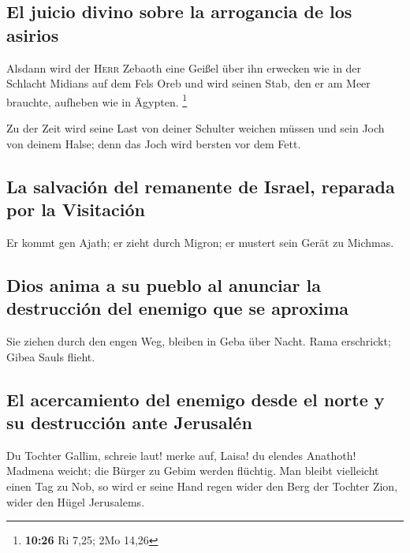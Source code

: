\hypertarget{el-juicio-divino-sobre-la-arrogancia-de-los-asirios}{%
\subsection{El juicio divino sobre la arrogancia de los
asirios}\label{el-juicio-divino-sobre-la-arrogancia-de-los-asirios}}

 Alsdann wird der \textsc{Herr} Zebaoth eine Geißel über
ihn erwecken wie in der Schlacht Midians auf dem Fels Oreb und wird
seinen Stab, den er am Meer brauchte, aufheben wie in Ägypten.
\footnote{\textbf{10:26} Ri 7,25; 2Mo 14,26}

 Zu der Zeit wird seine Last von deiner Schulter weichen
müssen und sein Joch von deinem Halse; denn das Joch wird bersten vor
dem Fett.

\hypertarget{la-salvaciuxf3n-del-remanente-de-israel-reparada-por-la-visitaciuxf3n}{%
\subsection{La salvación del remanente de Israel, reparada por la
Visitación}\label{la-salvaciuxf3n-del-remanente-de-israel-reparada-por-la-visitaciuxf3n}}

 Er kommt gen Ajath; er zieht durch Migron; er mustert
sein Gerät zu Michmas.

\hypertarget{dios-anima-a-su-pueblo-al-anunciar-la-destrucciuxf3n-del-enemigo-que-se-aproxima}{%
\subsection{Dios anima a su pueblo al anunciar la destrucción del
enemigo que se
aproxima}\label{dios-anima-a-su-pueblo-al-anunciar-la-destrucciuxf3n-del-enemigo-que-se-aproxima}}

 Sie ziehen durch den engen Weg, bleiben in Geba über
Nacht. Rama erschrickt; Gibea Sauls flieht.

\hypertarget{el-acercamiento-del-enemigo-desde-el-norte-y-su-destrucciuxf3n-ante-jerusaluxe9n}{%
\subsection{El acercamiento del enemigo desde el norte y su destrucción
ante
Jerusalén}\label{el-acercamiento-del-enemigo-desde-el-norte-y-su-destrucciuxf3n-ante-jerusaluxe9n}}

 Du Tochter Gallim, schreie laut! merke auf, Laisa! du
elendes Anathoth!  Madmena weicht; die Bürger zu Gebim
werden flüchtig.  Man bleibt vielleicht einen Tag zu Nob,
so wird er seine Hand regen wider den Berg der Tochter Zion, wider den
Hügel Jerusalems.

